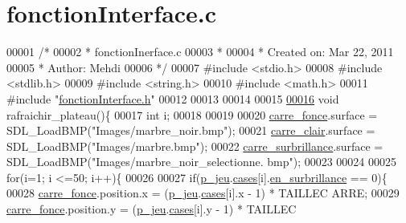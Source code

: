\hypertarget{fonction_interface_8c_source}{
\section{fonctionInterface.c}
}

\begin{DoxyCode}
00001 \textcolor{comment}{/*}
00002 \textcolor{comment}{ * fonctionInerface.c}
00003 \textcolor{comment}{ *}
00004 \textcolor{comment}{ *  Created on: Mar 22, 2011}
00005 \textcolor{comment}{ *      Author: Mehdi}
00006 \textcolor{comment}{ */}
00007 \textcolor{preprocessor}{#include <stdio.h>}
00008 \textcolor{preprocessor}{#include <stdlib.h>}
00009 \textcolor{preprocessor}{#include <string.h>}
00010 \textcolor{preprocessor}{#include <math.h>}
00011 \textcolor{preprocessor}{#include "\hyperlink{fonction_interface_8h}{fonctionInterface.h}"}
00012 
00013 
00014 
00015 
\hypertarget{fonction_interface_8c_source_l00016}{}\hyperlink{fonction_interface_8h_a242025f62105b1932bde128f77ec1ba8}{00016} \textcolor{keywordtype}{void} rafraichir\_plateau()\{
00017         \textcolor{keywordtype}{int} i;
00018 
00019 
00020         \hyperlink{fonction_interface_8h_a7e67ffd6431a872b2e0eed3293230b78}{carre_fonce}.surface = SDL\_LoadBMP(\textcolor{stringliteral}{"Images/marbre\_noir.bmp"});
00021         \hyperlink{fonction_interface_8h_aa6a56f4dc2396c5f9de42147f569c367}{carre_clair}.surface = SDL\_LoadBMP(\textcolor{stringliteral}{"Images/marbre.bmp"});
00022         \hyperlink{fonction_interface_8h_a28e2678f1d8d143ee4b21a11acfad35d}{carre_surbrillance}.surface = SDL\_LoadBMP(\textcolor{stringliteral}{"Images/marbre\_noir\_selectionne.
      bmp"});
00023 
00024 
00025         \textcolor{keywordflow}{for}(i=1; i <=50; i++)\{
00026 
00027                 \textcolor{keywordflow}{if}(\hyperlink{moteur_8h_a3efa8d0f7c65daedc584dc8db048e62c}{p_jeu}.\hyperlink{structplateau_a6afaa60f594542e0d742b0c6d3223392}{cases}[i].\hyperlink{structcase__plateau_ae49bb71ca6836b02fd9efa3c1fa64405}{en_surbrillance} == 0)\{
00028                         \hyperlink{fonction_interface_8h_a7e67ffd6431a872b2e0eed3293230b78}{carre_fonce}.position.x = (\hyperlink{moteur_8h_a3efa8d0f7c65daedc584dc8db048e62c}{p_jeu}.\hyperlink{structplateau_a6afaa60f594542e0d742b0c6d3223392}{cases}[i].x - 1) * TAILLEC
      ARRE;
00029                         \hyperlink{fonction_interface_8h_a7e67ffd6431a872b2e0eed3293230b78}{carre_fonce}.position.y = (\hyperlink{moteur_8h_a3efa8d0f7c65daedc584dc8db048e62c}{p_jeu}.\hyperlink{structplateau_a6afaa60f594542e0d742b0c6d3223392}{cases}[i].y - 1) * TAILLEC

\end{DoxyCode}
